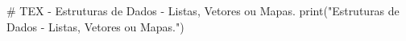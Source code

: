 # TEX - Estruturas de Dados - Listas, Vetores ou Mapas.
print("Estruturas de Dados - Listas, Vetores ou Mapas.")
